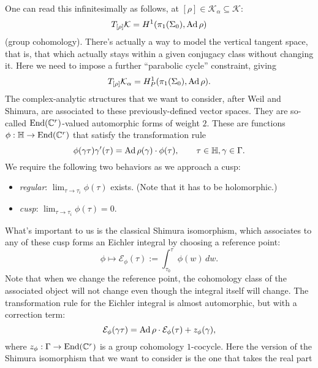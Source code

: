 \documentclass[reqno]{amsart} 
\numberwithin{theorem}{section}
\numberwithin{equation}{section}
\begin{document}
One can read this infinitesimally as follows, at $[\rho] \in \mathcal{K}_\alpha \subseteq \mathcal{K}$:
\begin{equation*}
  T_{[\rho]} \mathcal{K} = H^1(\pi_1(\Sigma_0), \operatorname{Ad} \rho)
\end{equation*}
(group cohomology).  There's actually a way to model the vertical tangent space, that is, that which actually stays within a given conjugacy class without changing it.  Here we need to impose a further ``parabolic cycle'' constraint, giving
\begin{equation*}
  T_{[\rho]} \mathcal{K}_\alpha = H_P^1(\pi_1(\Sigma_0), \operatorname{Ad} \rho).
\end{equation*}
The complex-analytic structures that we want to consider, after Weil and Shimura, are associated to these previously-defined vector spaces.  They are so-called $\operatorname{End}(\mathbb{C}^r)$-valued automorphic forms of weight $2$.  These are functions $\phi : \mathbb{H} \rightarrow \operatorname{End}(\mathbb{C}^r)$ that satisfy the transformation rule
\begin{equation*}
  \phi(\gamma \tau) \gamma '(\tau)= \operatorname{Ad} \rho(\gamma) \cdot \phi(\tau), \qquad \tau \in \mathbb{H}, \gamma \in \Gamma.
\end{equation*}
We require the following two behaviors as we approach a cusp:
\begin{itemize}
\item \emph{regular}: $\lim_{\tau \rightarrow \tau_i} \phi(\tau)$ exists.  (Note that it has to be holomorphic.)
\item \emph{cusp}: $\lim_{\tau \rightarrow \tau_i} \phi(\tau) = 0$.  
\end{itemize}
What's important to us is the classical Shimura isomorphism, which associates to any of these cusp forms an Eichler integral by choosing a reference point:
\begin{equation*}
  \phi \mapsto \mathcal{E}_\phi(\tau) := \int_{\tau_0}^\tau \phi(w) \, d w.
\end{equation*}
Note that when we change the reference point, the cohomology class of the associated object will not change even though the integral itself will change.  The transformation rule for the Eichler integral is almost automorphic, but with a correction term:
\begin{equation*}
  \mathcal{E}_\phi(\gamma \tau) = \operatorname{Ad} \rho \cdot \mathcal{E}_\phi(\tau) + z_\phi(\gamma),
\end{equation*}
where $z_\phi : \Gamma \rightarrow \operatorname{End}(\mathbb{C}^r)$ is a group cohomology $1$-cocycle.  Here the version of the Shimura isomorphism that we want to consider is the one that takes the real part
\end{document}

